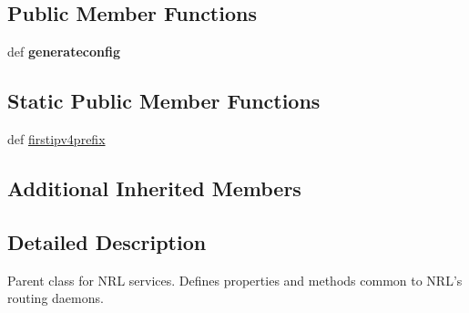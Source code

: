 \subsection*{Public Member Functions}
\begin{DoxyCompactItemize}
\item 
\hypertarget{classcore_1_1services_1_1nrl_1_1_nrl_service_a7018af150ae563397ceda5b897ef1d5a}{def {\bfseries generateconfig}}\label{classcore_1_1services_1_1nrl_1_1_nrl_service_a7018af150ae563397ceda5b897ef1d5a}

\end{DoxyCompactItemize}
\subsection*{Static Public Member Functions}
\begin{DoxyCompactItemize}
\item 
def \hyperlink{classcore_1_1services_1_1nrl_1_1_nrl_service_adffc5fa3bf32f7438cc1af0b900257f8}{firstipv4prefix}
\end{DoxyCompactItemize}
\subsection*{Additional Inherited Members}


\subsection{Detailed Description}
\begin{DoxyVerb}Parent class for NRL services. Defines properties and methods
    common to NRL's routing daemons.
\end{DoxyVerb}
 

